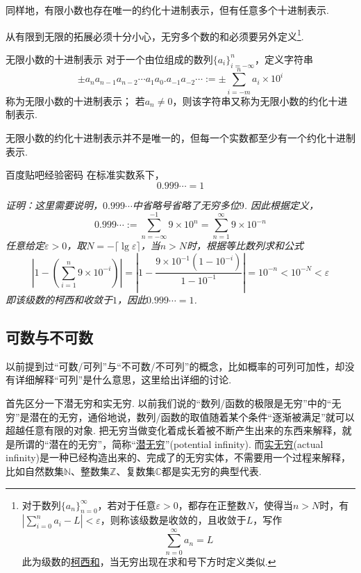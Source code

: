 \documentclass[main.tex]{subfiles}
\begin{document}
同样地，有限小数也存在唯一的约化十进制表示，但有任意多个十进制表示.

从有限到无限的拓展必须十分小心，无穷多个数的和必须要另外定义\footnote{对于数列\(\{a_n\}_{n=0}^{\infty}\)，若对于任意\(\varepsilon > 0\)，都存在正整数\(N\)，使得当\(n>N\)时，有\(\displaystyle{\left|\sum_{i=0}^{n}a_i-L\right| < \varepsilon}\)，则称该级数是收敛的，且收敛于\(L\)，写作\[\sum_{n=0}^{\infty}a_n=L\]此为级数的\uline{柯西和}，当无穷出现在求和号下方时定义类似.}.

\begin{definition}{无限小数的十进制表示}
    对于一个由位组成的数列\(\{a_i\}_{i=-\infty}^n\)，定义字符串
    \[\pm a_n a_{n-1} a_{n-2} \cdots a_1 a_0.a_{-1} a_{-2} \cdots := \pm \sum_{i=-m}^{n} a_i \times 10^i\]
    称为无限小数的十进制表示；
    \newline
    若\(a_n \neq 0\)，则该字符串又称为无限小数的约化十进制表示.
\end{definition}

无限小数的约化十进制表示并不是唯一的，但每一个实数都至少有一个约化十进制表示.

\begin{proposition}{百度贴吧经验密码}
    在标准实数系下，
    \[0.999\cdots = 1\]
\end{proposition}
\textit{
    证明：这里需要说明，\(0.999\cdots\)中省略号省略了无穷多位\(9\). 因此根据定义，
    \[0.999\cdots := \sum_{n=-\infty}^{-1} 9 \times 10^{n} = \sum_{n=1}^{\infty} 9 \times 10^{-n}\]
    任意给定\(\varepsilon > 0\)，取\(N=-\lceil\lg \varepsilon\rceil\)，当\(n>N\)时，根据等比数列求和公式
    \[\left| 1-\left(\sum_{i=1}^{n} 9 \times 10^{-i}\right) \right| = \left| 1-\frac{9\times 10^{-1}(1-10^{-i})}{1-10^{-1}} \right| =10^{-n}<10^{-N}<\varepsilon\]
    即该级数的柯西和收敛于\(1\)，因此\(0.999\cdots = 1\).
}


\subsection{可数与不可数}

以前提到过“可数/可列”与“不可数/不可列”的概念，比如概率的可列可加性，却没有详细解释“可列”是什么意思，这里给出详细的讨论.

首先区分一下潜无穷和实无穷. 以前我们说的“数列/函数的极限是无穷”中的“无穷”是潜在的无穷，通俗地说，数列/函数的取值随着某个条件“逐渐被满足”就可以超越任意有限的对象. 把无穷当做变化着成长着被不断产生出来的东西来解释，就是所谓的“潜在的无穷”，简称“\uline{潜无穷}”(potential infinity). 而\uline{实无穷}(actual infinity)是一种已经构造出来的、完成了的无穷实体，不需要用一个过程来解释，比如自然数集\(\mathbb{N}\)、整数集\(\mathbb{Z}\)、复数集\(\mathbb{C}\)都是实无穷的典型代表.
\end{document}
